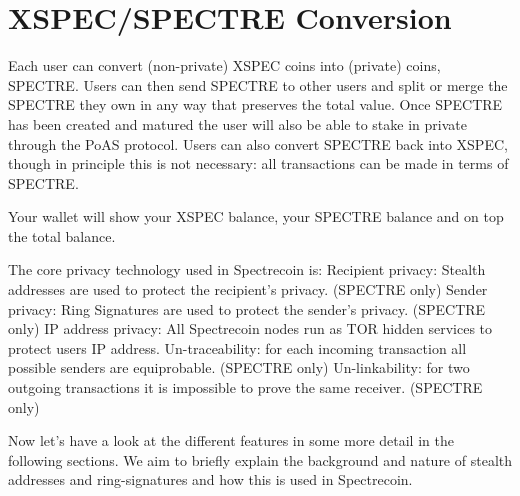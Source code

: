 \section{XSPEC/SPECTRE Conversion}
Each user can convert (non-private) XSPEC coins into (private) coins, SPECTRE.
Users can then send SPECTRE to other users and split or merge the SPECTRE they
own in any way that preserves the total value. Once SPECTRE has been created
and matured the user will also be able to stake in private through the PoAS
protocol. Users can also convert SPECTRE back into XSPEC, though in principle
this is not necessary: all transactions can be made in terms of SPECTRE.



Your wallet will show your XSPEC balance, your SPECTRE balance and on top the
total balance.



The core privacy technology used in Spectrecoin is: Recipient privacy: Stealth
addresses are used to protect the recipient’s privacy. (SPECTRE only) Sender
privacy: Ring Signatures are used to protect the sender’s privacy. (SPECTRE
only) IP address privacy: All Spectrecoin nodes run as TOR hidden services to
protect users IP address. Un-traceability: for each incoming transaction all
possible senders are equiprobable. (SPECTRE only) Un-linkability: for two
outgoing transactions it is impossible to prove the same receiver. (SPECTRE
only)



Now let’s have a look at the different features in some more detail in the
following sections. We aim to briefly explain the background and nature of
stealth addresses and ring-signatures and how this is used in Spectrecoin.
